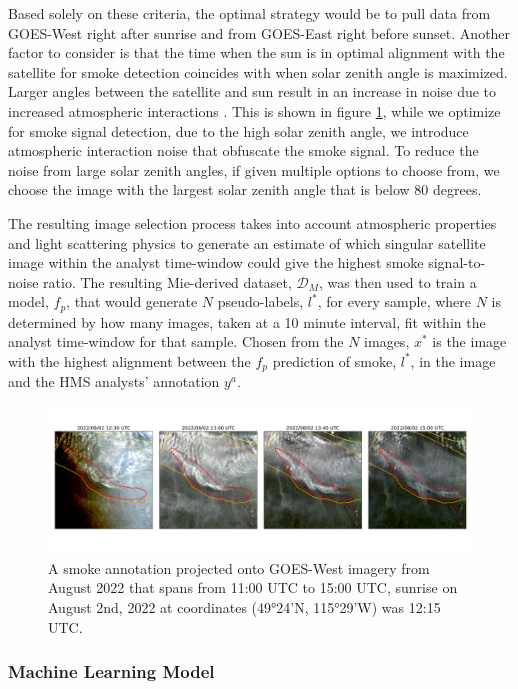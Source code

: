 \documentclass{article}
\begin{document}
Based solely on these criteria, the optimal strategy would be to pull data from GOES-West right after sunrise and from GOES-East right before sunset. Another factor to consider is that the time when the sun is in optimal alignment with the satellite for smoke detection coincides with when solar zenith angle is maximized. Larger angles between the satellite and sun result in an increase in noise due to increased atmospheric interactions \cite{zen_angle}.  This is shown in figure \ref{G17_sunrise}, while we optimize for smoke signal detection, due to the high solar zenith angle, we introduce atmospheric interaction noise that obfuscate the smoke signal. To reduce the noise from large solar zenith angles, if given multiple options to choose from, we choose the image with the largest solar zenith angle that is below 80 degrees.

The resulting image selection process takes into account atmospheric properties and light scattering physics to generate an estimate of which singular satellite image within the analyst time-window could give the highest smoke signal-to-noise ratio. The resulting Mie-derived dataset, \(\mathcal{D}_M\), was then used to train a model, \(f_p\), that would generate \(N\) pseudo-labels, \(l^*\), for every sample, where \(N\) is determined by how many images, taken at a 10 minute interval, fit within the analyst time-window for that sample. Chosen from the \(N\) images, \(x^*\) is the image with the highest alignment between the \(f_p\) prediction of smoke, \(l^*\), in the image and the HMS analysts' annotation \(y^{a}\).

\begin{figure}
    \centering
    \includegraphics[width=12cm]{figures/timelapse_G17_2.png}
    \caption{A smoke annotation projected onto GOES-West imagery from August 2022 that spans from 11:00 UTC to 15:00 UTC, sunrise on August 2nd, 2022 at coordinates (49°24'N, 115°29'W) was 12:15 UTC.}\label{G17_sunrise}
\end{figure}

\subsubsection*{Machine Learning Model} 
\end{document}
